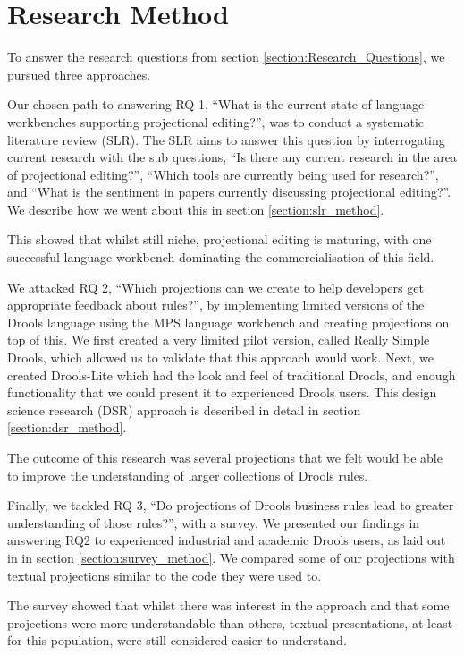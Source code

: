\section{Research Method}
\label{section:Research_Method}

To answer the research questions from section \ref{section:Research_Questions}, we pursued three approaches.

Our chosen path to answering RQ 1, ``What is the current state of language workbenches supporting projectional editing?'', was to conduct a systematic literature review (SLR).
The SLR aims to answer this question by interrogating current research with the sub questions, ``Is there any current research in the area of projectional editing?'',  ``Which tools are currently being used for research?'', and ``What is the sentiment in papers currently discussing projectional editing?''.
We describe how we went about this in section \ref{section:slr_method}. 

This showed that whilst still niche, projectional editing is maturing, with one successful language workbench dominating the commercialisation of this field.

We attacked RQ 2, ``Which projections can we create to help developers get appropriate feedback about rules?'', by implementing limited versions of the Drools language using the MPS language workbench and creating projections on top of this.
We first created a very limited pilot version, called Really Simple Drools, which allowed us to validate that this approach would work.
Next, we created Drools-Lite which had the look and feel of traditional Drools, and enough functionality that we could present it to experienced Drools users.
This design science research (DSR) approach is described in detail in section \ref{section:dsr_method}.

The outcome of this research was several projections that we felt would be able to improve the understanding of larger collections of Drools rules.

Finally, we tackled RQ 3, ``Do projections of Drools business rules lead to greater understanding of those rules?'', with a survey.
We presented our findings in answering RQ2 to experienced industrial and academic Drools users, as laid out in in section \ref{section:survey_method}.
We compared some of our projections with textual projections similar to the code they were used to.

The survey showed that whilst there was interest in the approach and that some projections were more understandable than others, textual presentations, at least for this population, were still considered easier to understand.